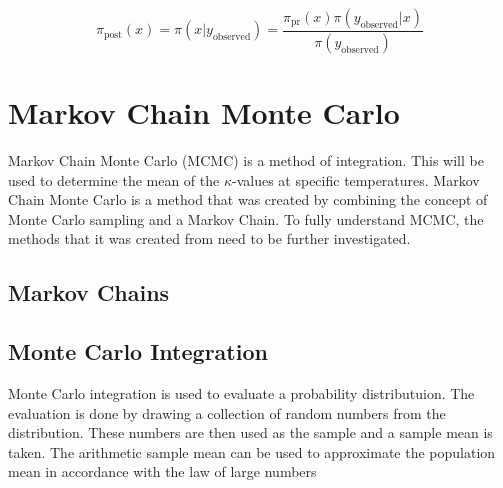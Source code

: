 	\begin{equation}
	\label{bayes_eq}
	\pi_{\text{post}}(x) = \pi(x|y_{\text{observed}}) = \frac{\pi_{\text{pr}}(x) \pi(y_{\text{observed}}|x)}{\pi (y_{\text{observed}})}	
	\end{equation}

\section{Markov Chain Monte Carlo}
Markov Chain Monte Carlo (MCMC) is a method of integration. This will be used to determine the mean of the $\kappa$-values at specific temperatures. 
	Markov Chain Monte Carlo is a method that was created by combining the concept of Monte Carlo sampling  and a Markov Chain. 
	To fully understand MCMC, the methods that it was created from need to be further investigated.
	\subsection{Markov Chains}
		
		
		
	\subsection{Monte Carlo Integration}
	Monte Carlo integration is used to evaluate a probability distributuion. 
	The evaluation is done by drawing a collection of random numbers from the distribution.
	These numbers are then used as the sample and a sample mean is taken.
	The arithmetic sample mean can be used to approximate the population mean in accordance with the law of large numbers \citep{Gilks:1996} 
